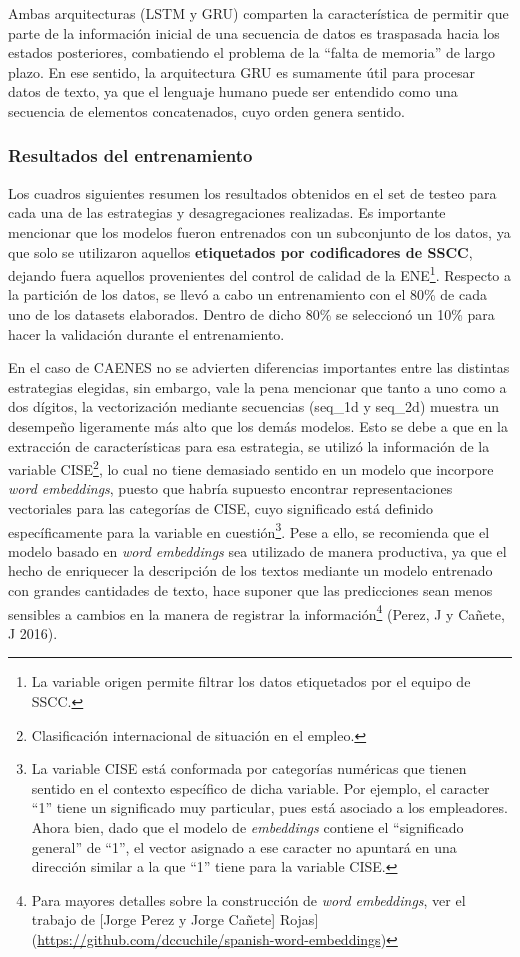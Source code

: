 \documentclass[
  12pt,
  spanish,
]{article}
\begin{document}
Ambas arquitecturas (LSTM y GRU) comparten la característica de permitir
que parte de la información inicial de una secuencia de datos es
traspasada hacia los estados posteriores, combatiendo el problema de la
``falta de memoria'' de largo plazo. En ese sentido, la arquitectura GRU
es sumamente útil para procesar datos de texto, ya que el lenguaje
humano puede ser entendido como una secuencia de elementos concatenados,
cuyo orden genera sentido.

\hypertarget{resultados-del-entrenamiento}{%
\subsubsection{Resultados del
entrenamiento}\label{resultados-del-entrenamiento}}

Los cuadros siguientes resumen los resultados obtenidos en el set de
testeo para cada una de las estrategias y desagregaciones realizadas. Es
importante mencionar que los modelos fueron entrenados con un
subconjunto de los datos, ya que solo se utilizaron aquellos
\textbf{etiquetados por codificadores de SSCC}, dejando fuera aquellos
provenientes del control de calidad de la ENE\footnote{La variable
  origen permite filtrar los datos etiquetados por el equipo de SSCC.}.
Respecto a la partición de los datos, se llevó a cabo un entrenamiento
con el 80\% de cada uno de los datasets elaborados. Dentro de dicho 80\%
se seleccionó un 10\% para hacer la validación durante el entrenamiento.

En el caso de CAENES no se advierten diferencias importantes entre las
distintas estrategias elegidas, sin embargo, vale la pena mencionar que
tanto a uno como a dos dígitos, la vectorización mediante secuencias
(seq\_1d y seq\_2d) muestra un desempeño ligeramente más alto que los
demás modelos. Esto se debe a que en la extracción de características
para esa estrategia, se utilizó la información de la variable
CISE\footnote{Clasificación internacional de situación en el empleo.},
lo cual no tiene demasiado sentido en un modelo que incorpore \emph{word
embeddings}, puesto que habría supuesto encontrar representaciones
vectoriales para las categorías de CISE, cuyo significado está definido
específicamente para la variable en cuestión\footnote{La variable CISE
  está conformada por categorías numéricas que tienen sentido en el
  contexto específico de dicha variable. Por ejemplo, el caracter ``1''
  tiene un significado muy particular, pues está asociado a los
  empleadores. Ahora bien, dado que el modelo de \emph{embeddings}
  contiene el ``significado general'' de ``1'', el vector asignado a ese
  caracter no apuntará en una dirección similar a la que ``1'' tiene
  para la variable CISE.}. Pese a ello, se recomienda que el modelo
basado en \emph{word embeddings} sea utilizado de manera productiva, ya
que el hecho de enriquecer la descripción de los textos mediante un
modelo entrenado con grandes cantidades de texto, hace suponer que las
predicciones sean menos sensibles a cambios en la manera de registrar la
información\footnote{Para mayores detalles sobre la construcción de
  \emph{word embeddings}, ver el trabajo de {[}Jorge Perez y Jorge
  Cañete{]}
  Rojas{]}(\url{https://github.com/dccuchile/spanish-word-embeddings})}
(Perez, J y Cañete, J 2016).
\end{document}
